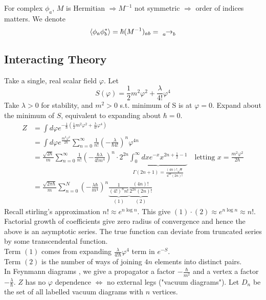 \documentclass{article}
\begin{document}
\begin{remark}
For complex $\phi_a$, $M$ is Hermitian $\Rightarrow M^{-1}$ not symmetric $\Rightarrow$ order of indices matters. We denote 
\[
\braket{ \phi_a \phi_b^\ast } = \hbar (M^{-1})_{ab} = \tensor[_a]{\rightarrow}{_b}
\]
\end{remark}

\subsection{Interacting Theory}
Take a single, real scalar field $\varphi$. Let 
\[
S(\varphi) = \frac{1}{2} m^2 \varphi^2 + \frac{\lambda}{4!}\varphi^4
\]
Take $\lambda>0$ for stability, and $m^2>0$ s.t. minimum of S is at $\varphi = 0$. Expand about the minimum of $S$, equivalent to expanding   about $\hbar = 0$. 
\begin{align*}
Z &= \int d\varphi e^{-\frac{1}{\hbar}(\frac{1}{2} m^2 \varphi^2 + \frac{\lambda}{4!}\varphi^4)} \\
&= \int d\varphi e^{\frac{m^2\varphi^2}{2\hbar}} \sum_{n=0}^\infty \frac{1}{n!} \left( -\frac{\lambda}{\hbar 4!} \right)^n \varphi^{4n} \\
&= \frac{\sqrt{2\hbar}}{m} \sum_{n=0}^\infty \frac{1}{n!} \left( - \frac{\hbar \lambda}{4! m^4} \right)^n \cdot 2^{2n} \underbrace{\int_0^\infty dx e^{-x} x^{2n+\frac{1}{2}-1}}_{\Gamma(2n+1)=\frac{(4n)! \sqrt{\pi}}{4^{2n}(2n)!}} \quad \text{letting } x=\frac{m^2 \varphi^2}{2\hbar}\\
&= \frac{\sqrt{2\pi\hbar}}{m} \sum_{n=0}^N \left( -\frac{\lambda \hbar}{m^4}\right)^n \underbrace{\frac{1}{(4!)^n n!}}_{(1)} \underbrace{\frac{(4n)!}{2^{2n}(2n)!}}_{(2)}
\end{align*}
Recall stirling's approximation $ n! \approx e^{n\log n}$. This give $(1)\cdot(2) \approx e^{n\log n} \approx n!$. Factorial growth of coefficients give zero radius of convergence and hence the above is an asymptotic series. The true function can deviate from truncated series by some transcendental function. \\
Term $(1)$ comes from expanding $\frac{\lambda}{4! \hbar} \varphi^4$ term in $e^{-S}$. \\
Term $(2)$ is the number of ways of joining $4n$ elements into distinct pairs. \\
In Feynmann diagrams , we give a propagator a factor $-\frac{\hbar}{m^2}$ and a vertex a factor $-\frac{\lambda}{\hbar}$. 
$Z$ has no $\varphi$ dependence $\Leftrightarrow$ no external legs ("vacuum diagrams"). Let $D_n$ be the set of all labelled vacuum diagrams with $n$ vertices.
\end{document}

